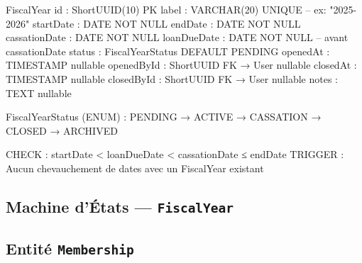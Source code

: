 \documentclass[12pt, a4paper]{report}
\begin{document}
\begin{codeBox}
FiscalYear {
  id              : ShortUUID(10)       PK
  label           : VARCHAR(20)         UNIQUE  -- ex: "2025-2026"
  startDate       : DATE                NOT NULL
  endDate         : DATE                NOT NULL
  cassationDate   : DATE                NOT NULL
  loanDueDate     : DATE                NOT NULL  -- avant cassationDate
  status          : FiscalYearStatus    DEFAULT PENDING
  openedAt        : TIMESTAMP           nullable
  openedById      : ShortUUID FK → User nullable
  closedAt        : TIMESTAMP           nullable
  closedById      : ShortUUID FK → User nullable
  notes           : TEXT                nullable
}

FiscalYearStatus (ENUM) : PENDING → ACTIVE → CASSATION → CLOSED → ARCHIVED

CHECK : startDate < loanDueDate < cassationDate ≤ endDate
TRIGGER : Aucun chevauchement de dates avec un FiscalYear existant
\end{codeBox}

\subsection{Machine d'États — \texttt{FiscalYear}}

\begin{center}
\end{center}

\subsection{Entité \texttt{Membership}}
\end{document}

